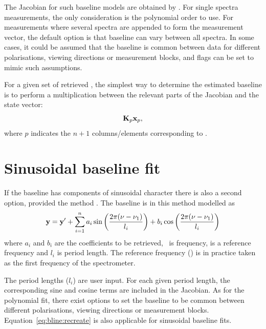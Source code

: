 The Jacobian for such baseline models are obtained by
. For single spectra measurements, the only
consideration is the polynomial order to use. For measurements where several
spectra are appended to form the measurement vector, the default option is that
baseline can vary between all spectra. In some cases, it could be assumed that
the baseline is common between data for different polarisations, viewing
directions or measurement blocks, and flags can be set to mimic such
assumptions.

For a given set of retrieved , the simplest way to determine the
estimated baseline is to perform a multiplication between the relevant parts of
the Jacobian and the state vector:
\begin{equation}
  \mathbf{K}_{p}\mathbf{x}_{p},
  \label{eq:bline:recreate}
\end{equation}
where $p$ indicates the $n+1$ columns/elements corresponding to .


\section{Sinusoidal baseline fit}
\label{sec:wfuns:sinefit}

If the baseline has components of sinusoidal character there is also a second
option, provided the method . The baseline is
in this method modelled as \citep{kuntz:97}
\begin{equation}
  \label{eq:sinefit}
  \mathbf{y} = \mathbf{y}' + \sum_{i=1}^n 
       a_i\sin\left(\frac{2\pi(\nu-\nu_{1})}{l_i}\right)+
       b_i\cos\left(\frac{2\pi(\nu-\nu_{1})}{l_i}\right)
\end{equation}
where $a_i$ and $b_i$ are the coefficients to be retrieved, \Frq\ is frequency,
 is a reference frequency and $l_i$ is period length. The reference
frequency () is in practice taken as the first frequency of the
spectrometer. 

The period lengths ($l_i$) are user input. For each given period length, the
corresponding sine and cosine terms are included in the Jacobian. As for the
polynomial fit, there exist options to set the baseline to be common between
different polarisations, viewing directions or measurement blocks.
Equation~\ref{eq:bline:recreate} is also applicable for sinusoidal baseline
fits.

